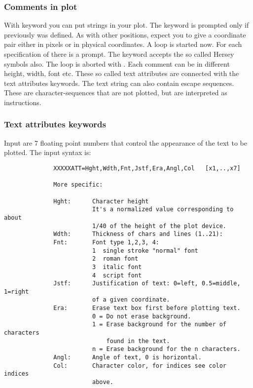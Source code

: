 \subsubsection*{Comments in plot}
              
With keyword  you can put strings in your plot.
The keyword is prompted only if previously  was
defined. As with other positions,  expect you to
give a coordinate pair either in pixels or in physical
coordinates. A loop is started now. For each specification
of  there is a  prompt. The keyword accepts
the so called Hersey symbols also. The loop is aborted
with . Each comment can be in different
height, width, font etc. These so called text attributes
are connected with the text attributes keywords.
The text string can also contain escape sequences. These
are character-sequences that are not plotted, but are
interpreted as instructions.
              
             
\subsubsection*{Text attributes keywords}

Input are 7 floating point numbers that control the
appearance of the text to be plotted. The input syntax is: 
 
\begin{verbatim}
              XXXXXATT=Hght,Wdth,Fnt,Jstf,Era,Angl,Col   [x1,..,x7]
              
              More specific:

              Hght:      Character height                                  
                         It's a normalized value corresponding to about 
                         1/40 of the height of the plot device.              
              Wdth:      Thickness of chars and lines (1..21):
              Fnt:       Font type 1,2,3, 4:                
                         1  single stroke "normal" font
                         2  roman font
                         3  italic font
                         4  script font
              Jstf:      Justification of text: 0=left, 0.5=middle, 1=right 
                         of a given coordinate.
              Era:       Erase text box first before plotting text.
                         0 = Do not erase background.
                         1 = Erase background for the number of characters 
                             found in the text.
                         n = Erase background for the n characters.
              Angl:      Angle of text, 0 is horizontal.
              Col:       Character color, for indices see color indices
                         above. 
\end{verbatim}              
             
